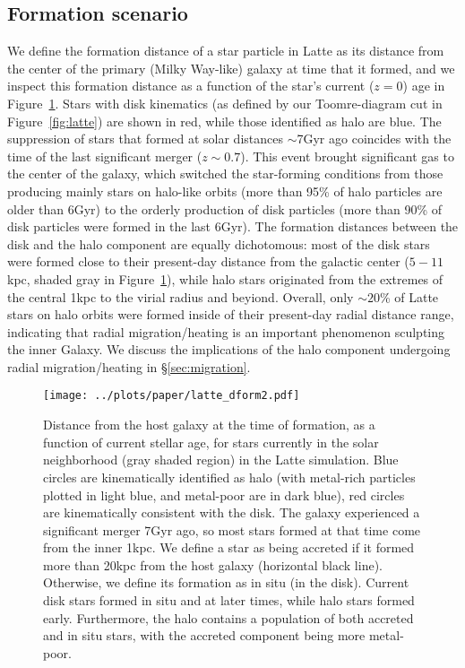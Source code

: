\documentclass[apj, twocolappendix, numberedappendix, appendixfloats]{emulateapj}
\begin{document}
\subsection{Formation scenario}
We define the formation distance of a star particle in Latte as its distance from the center of the primary (Milky Way-like) galaxy at time that it formed, and we inspect this formation distance as a function of the star's current ($z = 0$) age in Figure~\ref{fig:dform}.
Stars with disk kinematics (as defined by our Toomre-diagram cut in Figure~\ref{fig:latte}) are shown in red, while those identified as halo are blue.
The suppression of stars that formed at solar distances $\sim$7\;Gyr ago coincides with the time of the last significant merger ($z\sim0.7$).
This event brought significant gas to the center of the galaxy, which switched the star-forming conditions from those producing mainly stars on halo-like orbits (more than 95\% of halo particles are older than 6\;Gyr) to the orderly production of disk particles (more than 90\% of disk particles were formed in the last 6\;Gyr).
The formation distances between the disk and the halo component are equally dichotomous: most of the disk stars were formed close to their present-day distance from the galactic center ($5-11$\;kpc, shaded gray in Figure~\ref{fig:dform}), while halo stars originated from the extremes of the central 1\;kpc to the virial radius and beyiond.
Overall, only $\sim20$\% of Latte stars on halo orbits were formed inside of their present-day radial distance range, indicating that radial migration/heating is an important phenomenon sculpting the inner Galaxy.
We discuss the implications of the halo component undergoing radial migration/heating in \S\ref{sec:migration}.

\begin{figure}
\begin{center}
\texttt{[image: ../plots/paper/latte\_dform2.pdf]}
\caption{Distance from the host galaxy at the time of formation, as a function of current stellar age, for stars currently in the solar neighborhood (gray shaded region) in the Latte simulation.
Blue circles are kinematically identified as halo (with metal-rich particles plotted in light blue, and metal-poor are in dark blue), red circles are kinematically consistent with the disk.
The galaxy experienced a significant merger 7\;Gyr ago, so most stars formed at that time come from the inner 1\;kpc.
We define a star as being accreted if it formed more than 20\;kpc from the host galaxy (horizontal black line).
Otherwise, we define its formation as in situ (in the disk).
Current disk stars formed in situ and at later times, while halo stars formed early.
Furthermore, the halo contains a population of both accreted and in situ stars, with the accreted component being more metal-poor.}
\label{fig:dform}
\end{center}
\end{figure}
\end{document}
